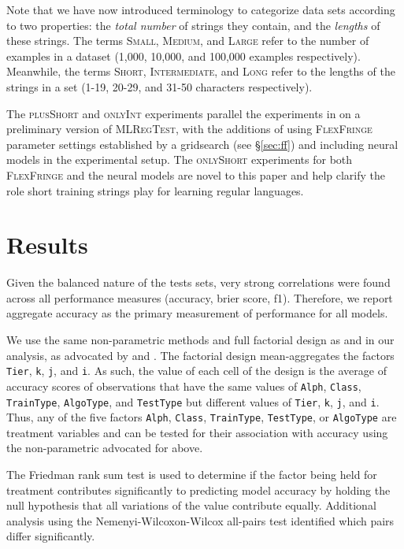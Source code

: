 \documentclass[twoside,11pt]{article}
\newcommand{\tscx}[1]{\textsc{#1}\xspace}
\newcommand{\ttt}[1]{\texttt{#1}}
\newcommand{\tttx}[1]{\ttt{#1}\xspace}
\newcommand{\Alpha}{\tttx{Alph}}
\newcommand{\Tier}{\tttx{Tier}}
\newcommand{\Class}{\tttx{Class}}
\newcommand{\kay}{\tttx{k}}
\newcommand{\jay}{\tttx{j}}
\newcommand{\eye}{\tttx{i}}
\newcommand{\TrainSize}{\tttx{TrainType}}
\newcommand{\TestType}{\tttx{TestType}}
\newcommand{\AlgoType}{\tttx{AlgoType}}
\newcommand{\sm}{\tscx{Small}}
\newcommand{\med}{\tscx{Medium}}
\newcommand{\lrg}{\tscx{Large}}
\newcommand{\short}{\tscx{Short}}
\newcommand{\orig}{\tscx{Intermediate}}
\newcommand{\lng}{\tscx{Long}}
\newcommand{\onlyShort}{\tscx{onlyShort}}
\newcommand{\plusShort}{\tscx{plusShort}}
\newcommand{\onlyInt}{\tscx{onlyInt}}
\begin{document}
Note that we have now introduced terminology to categorize data sets according to two properties: the \emph{total number} of strings they contain, and the \emph{lengths} of these strings.
The terms \sm{}, \med{}{}, and \lrg{} refer to the number of examples in a dataset (1,000, 10,000, and 100,000 examples respectively).
Meanwhile, the terms \short{}, \orig{}, and \lng{} refer to the lengths of the strings in a set (1-19, 20-29, and 31-50 characters respectively).

The \plusShort and \onlyInt experiments parallel the experiments in \citet{adil23} on a preliminary version of \textsc{MLRegTest}, with the additions of using \textsc{FlexFringe} parameter settings established by a gridsearch (see \S\ref{sec:ff}) and including neural models in the experimental setup. 
The \onlyShort experiments for both \textsc{FlexFringe} and the neural models are novel to this paper and help clarify the role short training strings play for learning regular languages.

\section{Results} \label{sec:results}

Given the balanced nature of the tests sets, very strong correlations
were found across all performance measures (accuracy, brier score,
f1). Therefore, we report aggregate accuracy as the primary
measurement of performance for all models.

We use the same non-parametric methods and full factorial design as
\citet{mlregtest} and \citet{adil23} in our analysis, as advocated by
\citet{Demsar2006} and \citet{Stapor2017}.
The factorial design mean-aggregates the factors \Tier, \kay, \jay,
and \eye. As such, the value of each cell of the design is the average
of accuracy scores of observations that have the same values of
\Alpha, \Class, \TrainSize, \AlgoType, and \TestType but different
values of \Tier, \kay, \jay, and \eye. Thus, any of the five factors
\Alpha, \Class, \TrainSize, \TestType, or \AlgoType are treatment
variables and can be tested for their association with accuracy using
the non-parametric advocated for above.

The Friedman rank sum test is used to determine if the factor being
held for treatment contributes significantly to predicting model
accuracy by holding the null hypothesis that all variations of the
value contribute equally. Additional analysis using the
Nemenyi-Wilcoxon-Wilcox all-pairs test identified which pairs differ
significantly.
\end{document}
